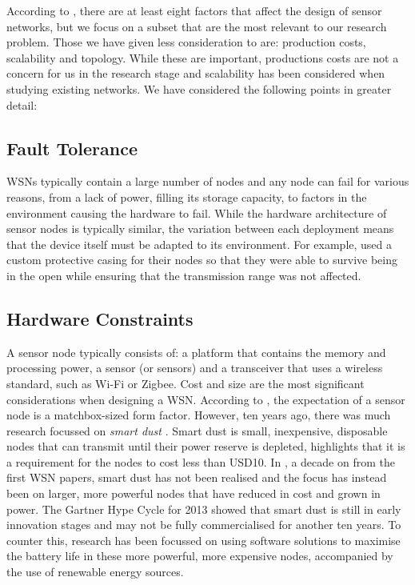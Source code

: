 According to \cite{Akyildiz2002}, there are at least eight factors that affect the design of sensor networks, but we focus on a subset that are the most relevant to our research problem. Those we have given less consideration to are: production costs, scalability and topology. While these are important, productions costs are not a concern for us in the research stage and scalability has been considered when studying existing networks. We have considered the following points in greater detail:

\subsection{Fault Tolerance}
	WSNs typically contain a large number of nodes and any node can fail for various reasons, from a lack of power, filling its storage capacity, to factors in the environment causing the hardware to fail. While the hardware architecture of sensor nodes is typically similar, the variation between each deployment means that the device itself must be adapted to its environment. For example, \cite{Mainwaring2002} used a custom protective casing for their nodes so that they were able to survive being in the open while ensuring that the transmission range was not affected.


\subsection{Hardware Constraints}
	A sensor node typically consists of: a platform that contains the memory and processing power,  a sensor (or sensors) and a transceiver that uses a wireless standard, such as Wi-Fi or Zigbee. Cost and size are the most significant considerations when designing a WSN. According to \cite{Intanagonwiwat2000}, the expectation of a sensor node is a matchbox-sized form factor. However, ten years ago, there was much research focussed on \textit{smart dust} \cite{Kahn}. Smart dust is small, inexpensive, disposable nodes that can transmit until their power reserve is depleted, \cite{Akyildiz2002a} highlights that it is a requirement for the nodes to cost less than USD10. In \cite{Corke2010a}, a decade on from the first WSN papers, smart dust has not been realised and the focus has instead been on larger, more powerful nodes that have reduced in cost and grown in power. The Gartner Hype Cycle for 2013 \cite{gartner2013} showed that smart dust is still in early innovation stages and may not be fully commercialised for another ten years. To counter this, research has been focussed on using software solutions to maximise the battery life in these more powerful, more expensive nodes, accompanied by the use of renewable energy sources.

